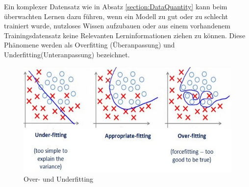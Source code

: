 \documentclass[12pt,oneside,a4paper,parskip]{scrbook}
\begin{document}
Ein komplexer Datensatz wie in Absatz \ref{section:DataQuantity} kann beim überwachten Lernen dazu führen, wenn ein Modell zu gut oder zu schlecht trainiert wurde, nutzloses Wissen aufzubauen oder aus einem vorhandenem Trainingsdatensatz keine Relevanten Lerninformationen ziehen zu können. Diese Phänomene werden als Overfitting (Überanpassung) und Underfitting(Unteranpassung) bezeichnet.

\begin{figure}[h]
	\begin{center}
		\includegraphics[width=12cm]{Bilder/overUnderfitting.png}
		\caption{Over- und Underfitting}
		\label{fig:overUnderFitting}
	\end{center}
\end{figure}
\end{document}
